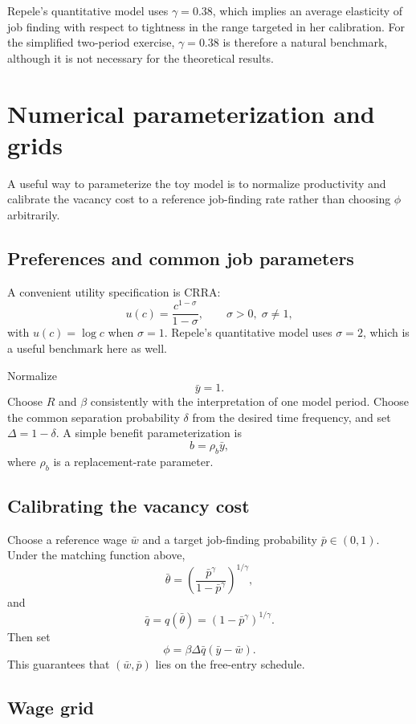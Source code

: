 \documentclass[11pt]{article}
\newcommand{\1}{\mathbf{1}}
\begin{document}
Repele's quantitative model uses $\gamma=0.38$, which implies an average elasticity of job finding with respect to tightness in the range targeted in her calibration. For the simplified two-period exercise, $\gamma=0.38$ is therefore a natural benchmark, although it is not necessary for the theoretical results.

\section{Numerical parameterization and grids}

A useful way to parameterize the toy model is to normalize productivity and calibrate the vacancy cost to a reference job-finding rate rather than choosing $\phi$ arbitrarily.

\subsection*{Preferences and common job parameters}

A convenient utility specification is CRRA:
\[
u(c)=\frac{c^{1-\sigma}}{1-\sigma}, \qquad \sigma>0,\;\sigma\neq 1,
\]
with $u(c)=\log c$ when $\sigma=1$. Repele's quantitative model uses $\sigma=2$, which is a useful benchmark here as well.

Normalize
\[
\bar y=1.
\]
Choose $R$ and $\beta$ consistently with the interpretation of one model period. Choose the common separation probability $\delta$ from the desired time frequency, and set $\Delta=1-\delta$. A simple benefit parameterization is
\[
b=\rho_b\bar y,
\]
where $\rho_b$ is a replacement-rate parameter.

\subsection*{Calibrating the vacancy cost}

Choose a reference wage $\bar w$ and a target job-finding probability $\bar p\in(0,1)$. Under the matching function above,
\[
\bar\theta=\left(\frac{\bar p^\gamma}{1-\bar p^\gamma}\right)^{1/\gamma},
\]
and
\[
\bar q=q(\bar\theta)=\left(1-\bar p^\gamma\right)^{1/\gamma}.
\]
Then set
\[
\phi=\beta\Delta\bar q(\bar y-\bar w).
\tag{3}
\]
This guarantees that $(\bar w,\bar p)$ lies on the free-entry schedule.

\subsection*{Wage grid}
\end{document}
